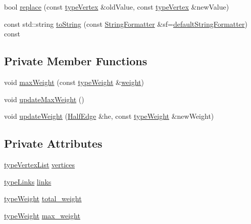\begin{DoxyCompactItemize}
\item 
bool \hyperlink{classGraphUndirected_aee3bc279ffe39f8efb7dd60865279474}{replace} (const \hyperlink{edge_8h_a5fbd20c46956d479cb10afc9855223f6}{type\+Vertex} \&old\+Value, const \hyperlink{edge_8h_a5fbd20c46956d479cb10afc9855223f6}{type\+Vertex} \&new\+Value)
\item 
const std\+::string \hyperlink{classGraphUndirected_a61604a0840f044d52a2762f44635fa9c}{to\+String} (const \hyperlink{classStringFormatter}{String\+Formatter} \&sf=\hyperlink{stringFormatter_8h_abf1349c8e24162d0134072aff288f2a2}{default\+String\+Formatter}) const
\end{DoxyCompactItemize}
\subsection*{Private Member Functions}
\begin{DoxyCompactItemize}
\item 
void \hyperlink{classGraphUndirected_a99cc719c89bd4afb612cdae920939a00}{max\+Weight} (const \hyperlink{edge_8h_a2e7ea3be891ac8b52f749ec73fee6dd2}{type\+Weight} \&\hyperlink{classGraphUndirected_ae40d431c92d8b4884c7915c44d42f356}{weight})
\item 
void \hyperlink{classGraphUndirected_a10582b249617c876bdf298f675285960}{update\+Max\+Weight} ()
\item 
void \hyperlink{classGraphUndirected_aba42cbb7de421af5452f50025154ec73}{update\+Weight} (\hyperlink{classHalfEdge}{Half\+Edge} \&he, const \hyperlink{edge_8h_a2e7ea3be891ac8b52f749ec73fee6dd2}{type\+Weight} \&new\+Weight)
\end{DoxyCompactItemize}
\subsection*{Private Attributes}
\begin{DoxyCompactItemize}
\item 
\hyperlink{graphInterface_8h_a21d54d8a139def524d3b0d6f71ec4974}{type\+Vertex\+List} \hyperlink{classGraphUndirected_a2b3210c4f2c00e9db131eb051c23f2e0}{vertices}
\item 
\hyperlink{graphInterface_8h_a31ca98f3d40433c4c9e20fe8901d4392}{type\+Links} \hyperlink{classGraphUndirected_a9325f02f5d038919f3d5db197da83214}{links}
\item 
\hyperlink{edge_8h_a2e7ea3be891ac8b52f749ec73fee6dd2}{type\+Weight} \hyperlink{classGraphUndirected_a713f460aba5e5ee4d3079f5df25fe14d}{total\+\_\+weight}
\item 
\hyperlink{edge_8h_a2e7ea3be891ac8b52f749ec73fee6dd2}{type\+Weight} \hyperlink{classGraphUndirected_a192e23963095ecfe1b327ba188a26bee}{max\+\_\+weight}
\end{DoxyCompactItemize}


